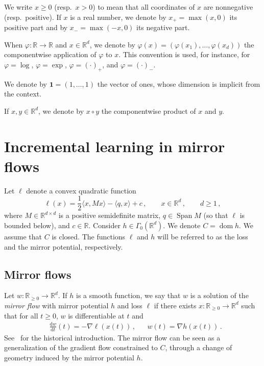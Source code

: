 \documentclass[11pt,english,reqno]{article}
\DeclareMathOperator{\Span}{Span}
\DeclareMathOperator{\dom}{dom}
\newcommand{\diff}{\mathrm{d}}
\newcommand{\R}{\mathbb{R}}
\renewcommand{\geq}{\geqslant}
\theoremstyle{plain}
\theoremstyle{definition}
\theoremstyle{remark}
\numberwithin{equation}{section}
\begin{document}
We write $x \geq 0$ (resp.~$x > 0$) to mean that all coordinates of $x$ are nonnegative (resp.~positive). If $x$ is a real number, we denote by $x_+ = \max(x,0)$ its positive part and by $x_- = \max(-x,0)$ its negative part.
	
	When $\varphi:\R\to\R$ and $x \in \R^d$, we denote by $\varphi(x) = (\varphi(x_1), \dots, \varphi(x_d))$ the componentwise application of $\varphi$ to $x$. This convention is used, for instance, for $\varphi = \log$, $\varphi = \exp$, $\varphi = (\cdot)_+$, and $\varphi = (\cdot)_-$.

	We denote by $\mathbf{1} = (1, \dots, 1)$ the vector of ones, whose dimension is implicit from the context.

	If $x, y \in \R^d$, we denote by $x \circ y$ the componentwise product of $x$ and $y$.




\section{Incremental learning in mirror flows}
\label{sec:incremental}

Let $\ell$ denote a convex quadratic function 
\begin{equation*}
	\ell(x) = \frac{1}{2} \langle x , M x \rangle - \langle q , x \rangle + c \, , \qquad x \in \R^d \, , \qquad d \geq 1 \, ,
\end{equation*}
where $M \in \R^{d \times d}$ is a positive semidefinite matrix, $q \in \Span M$ (so that $\ell$ is bounded below), and $c \in \R$.
%
Consider $h \in \Gamma_0(\R^d)$. We denote $C = \dom h$. We assume that $C$ is closed. The functions $\ell$ and $h$ will be referred to as the loss and the mirror potential, respectively.

\subsection{Mirror flows}

Let $w : \R_{\geq 0} \to \R^d$. If $h$ is a smooth function, we say that $w$ is a solution of the \emph{mirror flow} with mirror potential $h$ and loss $\ell$ if there exists $x : \R_{\geq 0} \to \R^d$ such that for all $t \geq 0$, $w$ is differentiable at $t$ and
\begin{align}
	\label{eq:mirror-flow}
	&\frac{\diff w}{\diff t}(t) = - \nabla \ell(x(t)) \, , &&w(t) = \nabla h(x(t)) \, .
\end{align}
See~\cite{nemirovskij1983problem} for the historical introduction. The mirror flow can be seen as a generalization of the gradient flow constrained to $C$, through a change of geometry induced by the mirror potential $h$.
\end{document}
